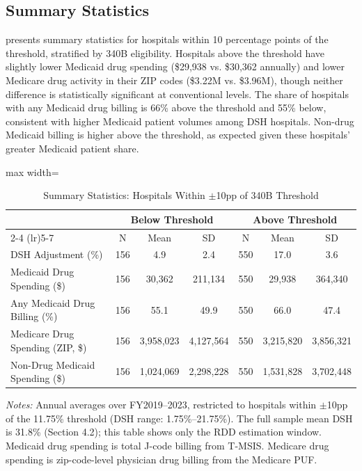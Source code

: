 \documentclass[12pt]{article}
\begin{document}
\subsection{Summary Statistics}

 presents summary statistics for hospitals within 10 percentage points of the threshold, stratified by 340B eligibility. Hospitals above the threshold have slightly lower Medicaid drug spending (\$29,938 vs. \$30,362 annually) and lower Medicare drug activity in their ZIP codes (\$3.22M vs. \$3.96M), though neither difference is statistically significant at conventional levels. The share of hospitals with any Medicaid drug billing is 66\% above the threshold and 55\% below, consistent with higher Medicaid patient volumes among DSH hospitals. Non-drug Medicaid billing is higher above the threshold, as expected given these hospitals' greater Medicaid patient share.

\begin{table}[H]
\centering
\caption{Summary Statistics: Hospitals Within $\pm$10pp of 340B Threshold}
\label{tab:summ_stats}
\begin{adjustbox}{max width=\textwidth}
\begin{threeparttable}
\begin{tabular}{lcccccc}
\toprule
& \multicolumn{3}{c}{Below Threshold} & \multicolumn{3}{c}{Above Threshold} \\
\cmidrule(lr){2-4} \cmidrule(lr){5-7}
& N & Mean & SD & N & Mean & SD \\
\midrule
DSH Adjustment (\%) & 156 & 4.9 & 2.4 & 550 & 17.0 & 3.6 \\
Medicaid Drug Spending (\$) & 156 & 30,362 & 211,134 & 550 & 29,938 & 364,340 \\
Any Medicaid Drug Billing (\%) & 156 & 55.1 & 49.9 & 550 & 66.0 & 47.4 \\
Medicare Drug Spending (ZIP, \$) & 156 & 3,958,023 & 4,127,564 & 550 & 3,215,820 & 3,856,321 \\
Non-Drug Medicaid Spending (\$) & 156 & 1,024,069 & 2,298,228 & 550 & 1,531,828 & 3,702,448 \\
\bottomrule
\end{tabular}
\begin{tablenotes}[flushleft]
\small
\item \textit{Notes:} Annual averages over FY2019--2023, restricted to hospitals within $\pm$10pp of the 11.75\% threshold (DSH range: 1.75\%--21.75\%). The full sample mean DSH is 31.8\% (Section 4.2); this table shows only the RDD estimation window. Medicaid drug spending is total J-code billing from T-MSIS. Medicare drug spending is zip-code-level physician drug billing from the Medicare PUF.
\end{tablenotes}
\end{threeparttable}
\end{adjustbox}
\end{table}
\end{document}
